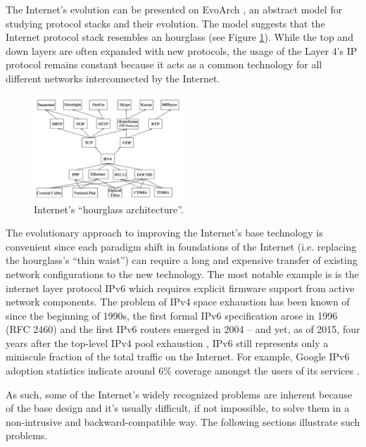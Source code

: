     The Internet's evolution can be presented on EvoArch \cite{EvoArch}, an abstract model for studying protocol stacks and their evolution. The model suggests that the Internet protocol stack resembles an hourglass (see Figure \ref{fig:inet_hourglass}). While the top and down layers are often expanded with new protocols, the usage of the Layer 4's IP protocol remains constant because it acts as a common technology for all different networks interconnected by the Internet.

    \begin{figure}[H]
        \begin{center}
            \includegraphics[width=0.5\textwidth]{fig/problems_hourglass.png}
          \caption{Internet's ``hourglass architecture''.}
          \label{fig:inet_hourglass}
        \end{center}
    \end{figure}


    The evolutionary approach to improving the Internet's base technology is convenient since each paradigm shift in foundations of the Internet (i.e. replacing the hourglass's ``thin waist'') can require a long and expensive transfer of existing network configurations to the new technology. The most notable example is is the internet layer protocol IPv6 which requires explicit firmware support from active network components. The problem of IPv4 space exhaustion has been known of since the beginning of 1990s, the first formal IPv6 specification arose in 1996 (RFC 2460) and the first IPv6 routers emerged in 2004 -- and yet, as of 2015, four years after the top-level IPv4 pool exhaustion \cite{ipv4_exhaustion}, IPv6 still represents only a miniscule fraction of the total traffic on the Internet. For example, Google IPv6 adoption statistics indicate around 6\% coverage amongst the users of its services \cite{ipv6stats}.

    As such, some of the Internet's widely recognized problems are inherent because of the base design and it's usually difficult, if not impossible, to solve them in a non-intrusive and backward-compatible way. The following sections illustrate such problems.

